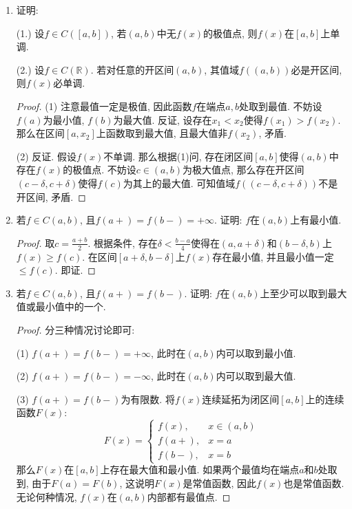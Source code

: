 \documentclass[UTF8,11pt, a4paper, oneside, fontset=none]{ctexbook}
\begin{document}
\begin{enumerate}
\begin{proof}
\end{proof}

\item 证明:

(1.) 设$f \in C([a, b])$, 若$(a, b)$中无$f(x)$的极值点, 则$f(x)$在$[a, b]$上单调.

(2.) 设$f \in C(\mathbb R)$. 若对任意的开区间$(a, b)$, 其值域$f((a, b))$必是开区间, 则$f(x)$必单调.


\begin{proof}

(1) 注意最值一定是极值, 因此函数$f$在端点$a, b$处取到最值. 不妨设$f(a)$为最小值, $f(b)$为最大值. 反证, 设存在$x_1 < x_2$使得$f(x_1) > f(x_2)$. 那么在区间$[a, x_2]$上函数取到最大值, 且最大值非$f(x_2)$, 矛盾.

(2) 反证. 假设$f(x)$不单调. 那么根据(1)问, 存在闭区间$[a, b]$使得$(a, b)$中存在$f(x)$的极值点. 不妨设$c\in(a, b)$为极大值点, 那么存在开区间$(c-\delta, c+\delta)$使得$f(c)$为其上的最大值. 可知值域$f((c-\delta, c+\delta))$不是开区间, 矛盾.

\end{proof}

\item 若$f \in C(a, b)$, 且$f(a+) = f(b-) = +\infty$. 证明: $f$在$(a, b)$上有最小值.

\begin{proof}

取$c = \frac{a+b}{2}$. 根据条件, 存在$\delta < \frac{b-a}{4}$使得在$(a, a+\delta)$和$(b-\delta, b)$上$f(x) \geq  f(c)$. 在区间$[a+\delta, b-\delta]$上$f(x)$存在最小值, 并且最小值一定$\leq f(c)$. 即证.

\end{proof}

\item 若$f \in C(a, b)$, 且$f(a+) = f(b-)$. 证明: $f$在$(a, b)$上至少可以取到最大值或最小值中的一个.


\begin{proof}

分三种情况讨论即可:

(1) $f(a+) = f(b-) = +\infty$, 此时在$(a, b)$内可以取到最小值.

(2) $f(a+) = f(b-) = -\infty$, 此时在$(a, b)$内可以取到最大值.

(3) $f(a+) = f(b-)$为有限数. 将$f(x)$连续延拓为闭区间$[a, b]$上的连续函数$F(x)$: 
\[
F(x) = \begin{cases} 
f(x), & x \in (a, b)\\
f(a+), & x =a\\
f(b-), & x =b
\end{cases}
\]
那么$F(x)$在$[a, b]$上存在最大值和最小值. 如果两个最值均在端点$a$和$b$处取到, 由于$F(a) = F(b)$, 这说明$F(x)$是常值函数, 因此$f(x)$也是常值函数. 无论何种情况, $f(x)$在$(a, b)$内部都有最值点.



\end{proof}
\end{enumerate}
\end{document}
